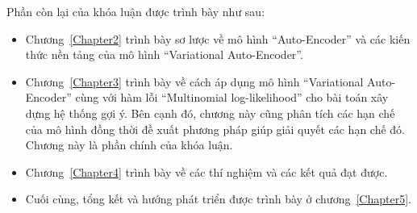 


Phần còn lại của khóa luận được trình bày như sau:

\begin{itemize}
    \item Chương~\ref{Chapter2} trình bày sơ lược về mô hình ``Auto-Encoder'' và các kiến thức nền tảng của mô hình ``Variational Auto-Encoder''.
    \item Chương~\ref{Chapter3} trình bày về cách áp dụng mô hình ``Variational Auto-Encoder'' cùng với hàm lỗi ``Multinomial log-likelihood'' cho bài toán xây dựng hệ thống gợi ý. Bên cạnh đó, chương này cũng phân tích các hạn chế của mô hình đồng thời đề xuất phương pháp giúp giải quyết các hạn chế đó. Chương này là phần chính của khóa luận.
    \item Chương~\ref{Chapter4} trình bày về các thí nghiệm và các kết quả đạt được.
    \item Cuối cùng, tổng kết và hướng phát triển được trình bày ở chương~\ref{Chapter5}.
\end{itemize}

